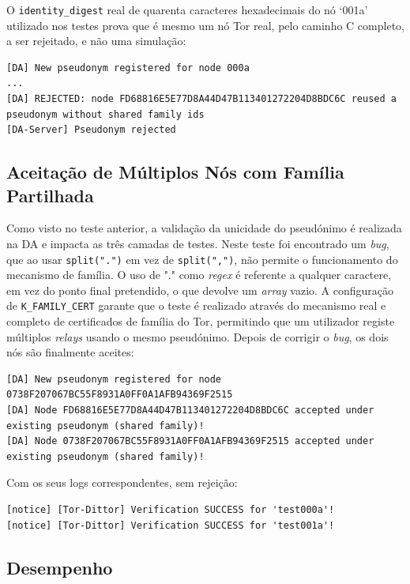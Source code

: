 O \texttt{identity\_digest} real de quarenta caracteres hexadecimais do nó `001a' utilizado nos testes prova que é mesmo um nó Tor real, pelo caminho C completo, a ser rejeitado, e não uma simulação:

\begin{lstlisting}
[DA] New pseudonym registered for node 000a
...
[DA] REJECTED: node FD68816E5E77D8A44D47B113401272204D8BDC6C reused a pseudonym without shared family ids
[DA-Server] Pseudonym rejected
\end{lstlisting}

\subsection{Aceitação de Múltiplos Nós com Família Partilhada}
\label{sub:teste_aceitacao_familia_partilhada}

Como visto no teste anterior, a validação da unicidade do pseudónimo é realizada na DA e impacta as três camadas de testes. Neste teste foi encontrado um \textit{bug}, que ao usar \texttt{split(".")} em vez de \texttt{split(",")}, não permite o funcionamento do mecanismo de família. O uso de "." como \textit{regex} é referente a qualquer caractere, em vez do ponto final pretendido, o que devolve um \textit{array} vazio. A configuração de \texttt{K\_FAMILY\_CERT} garante que o teste é realizado através do mecanismo real e completo de certificados de família do Tor, permitindo que um utilizador registe múltiplos \textit{relays} usando o mesmo pseudónimo. Depois de corrigir o \textit{bug}, os dois nós são finalmente aceites:

\begin{lstlisting}
[DA] New pseudonym registered for node 0738F207067BC55F8931A0FF0A1AFB94369F2515
[DA] Node FD68816E5E77D8A44D47B113401272204D8BDC6C accepted under existing pseudonym (shared family)!
[DA] Node 0738F207067BC55F8931A0FF0A1AFB94369F2515 accepted under existing pseudonym (shared family)!
\end{lstlisting}

Com os seus logs correspondentes, sem rejeição:

\begin{lstlisting}
[notice] [Tor-Dittor] Verification SUCCESS for 'test000a'!
[notice] [Tor-Dittor] Verification SUCCESS for 'test001a'!
\end{lstlisting}

\subsection{Desempenho}
\label{sub:teste_desempenho}


